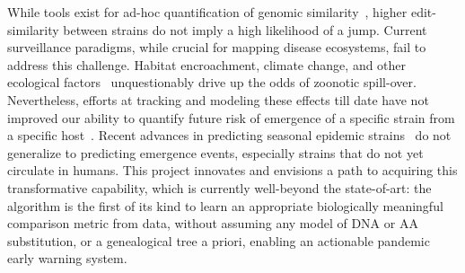 \documentclass[onecolumn, compsoc,12pt]{IEEEtran}
\begin{document}
While  tools exist for ad-hoc quantification of genomic similarity~\cite{posada1998modeltest,goldberger2005genomic,huelsenbeck1997phylogeny,neher2014predicting,VanderMeer2010,Smith2009}, higher edit-similarity between strains do not imply a high likelihood of a jump.
Current surveillance paradigms, while crucial for mapping  disease ecosystems,  fail  to address this challenge. Habitat encroachment, climate change, and other  ecological factors~\cite{rulli2017nexus,chua2002anthropogenic,childs2004zoonotic} unquestionably  drive up the odds of zoonotic spill-over. Nevertheless, efforts at tracking and modeling these effects till date have not improved our ability to quantify future  risk of emergence of a specific strain from a specific host~\cite{fair2019viral}. Recent advances in predicting seasonal epidemic strains~\cite{huddleston2020integrating} do not generalize to predicting emergence events, especially strains that do not yet circulate in humans. This project innovates and envisions a path to acquiring this transformative capability, which is currently well-beyond the state-of-art: the \enet algorithm is  the first of its kind to learn an appropriate biologically meaningful comparison metric from data, without assuming any model of DNA or AA substitution, or a genealogical tree a priori,%
 enabling an actionable pandemic early warning system. %






\clearpage
{}


 



\clearpage

\end{document}
